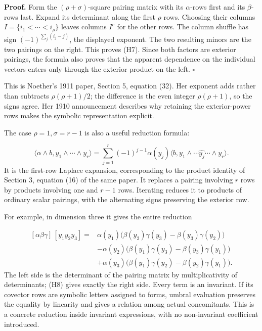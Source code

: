 \documentclass[
]{article}
\begin{document}
\textbf{Proof.} Form the \((\rho+\sigma)\)-square pairing matrix with
its \(\alpha\)-rows first and its \(\beta\)-rows last. Expand its
determinant along the first \(\rho\) rows. Choosing their columns
\(I=\{i_1<\cdots<i_\rho\}\) leaves columns \(I^c\) for the other rows.
The column shuffle has sign \((-1)^{\sum_j(i_j-j)}\), the displayed
exponent. The two resulting minors are the two pairings on the right.
This proves (H7). Since both factors are exterior pairings, the formula
also proves that the apparent dependence on the individual vectors
enters only through the exterior product on the left. \(\square\)

This is Noether's 1911 paper, Section 5, equation (32). Her exponent
adds rather than subtracts \(\rho(\rho+1)/2\); the difference is the
even integer \(\rho(\rho+1)\), so the signs agree. Her 1910 announcement
describes why retaining the exterior-power rows makes the symbolic
representation explicit.

The case \(\rho=1,\sigma=r-1\) is also a useful reduction formula:
\protect{}\label{equation-H8}{}

\[
\langle\alpha\wedge b,y_1\wedge\cdots\wedge y_r\rangle
=\sum_{j=1}^r(-1)^{j-1}
\alpha(y_j)\langle b,y_1\wedge\cdots\widehat{y_j}\cdots\wedge y_r\rangle.
\tag{H8}
\] It is the first-row Laplace expansion, corresponding to the product
identity of Section 3, equation (16) of the same paper. It replaces a
pairing involving \(r\) rows by products involving one and \(r-1\) rows.
Iterating reduces it to products of ordinary scalar pairings, with the
alternating signs preserving the exterior row.

For example, in dimension three it gives the entire reduction
\protect{}\label{equation-H9}{}

\[
\begin{split}
[\alpha\beta\gamma]\,[y_1y_2y_3]
={}&\alpha(y_1)\bigl(\beta(y_2)\gamma(y_3)-\beta(y_3)\gamma(y_2)\bigr)\\
&-\alpha(y_2)\bigl(\beta(y_1)\gamma(y_3)-\beta(y_3)\gamma(y_1)\bigr)\\
&+\alpha(y_3)\bigl(\beta(y_1)\gamma(y_2)-\beta(y_2)\gamma(y_1)\bigr).
\end{split}
\tag{H9}
\] The left side is the determinant of the pairing matrix by
multiplicativity of determinants; (H8) gives exactly the right side.
Every term is an invariant. If its covector rows are symbolic letters
assigned to forms, umbral evaluation preserves the equality by linearity
and gives a relation among actual concomitants. This is a concrete
reduction inside invariant expressions, with no non-invariant
coefficient introduced.
\end{document}

